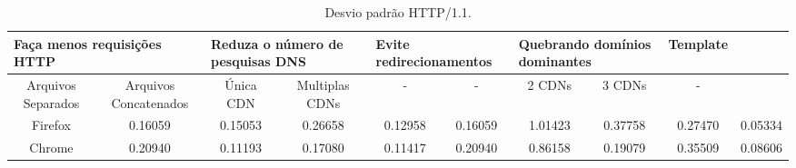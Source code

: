 \begin{table}[h]
	\centering
	\caption{Desvio padrão HTTP/1.1.}
	\label{desviopadraohttp11}
	\begin{tabular}{cccccccccc}
		\hline
        \multicolumn{2}{l}{\textbf{Faça menos requisições HTTP}} & \multicolumn{2}{l}{\textbf{Reduza o número de pesquisas DNS}} & \multicolumn{2}{l}{\textbf{Evite redirecionamentos}} & \multicolumn{2}{l}{\textbf{Quebrando domínios dominantes}} & \textbf{Template} \\
		\hline
        Arquivos Separados & Arquivos Concatenados & Única CDN & Multiplas CDNs & - & - & 2 CDNs & 3 CDNs & - \\
		Firefox & 0.16059 & 0.15053 & 0.26658 & 0.12958 & 0.16059 & 1.01423 & 0.37758 & 0.27470 & 0.05334  \\
		Chrome & 0.20940 & 0.11193 & 0.17080 & 0.11417 & 0.20940 & 0.86158 & 0.19079 & 0.35509 & 0.08606  \\
		\hline
	\end{tabular}
\end{table}